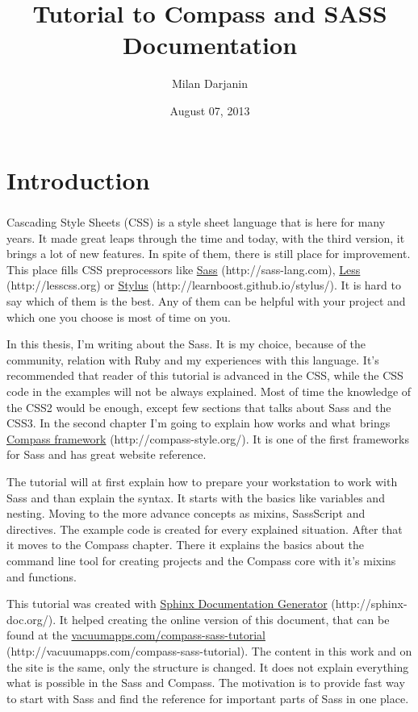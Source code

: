 \documentclass[a4paper,12pt,oneside]{sphinxmanual}
\title{Tutorial to Compass and SASS Documentation}
\date{August 07, 2013}
\author{Milan Darjanin}
\begin{document}
\maketitle
\tableofcontents
{}\label{index::doc}

\chapter*{Introduction}

      \paragraph{}
      Cascading Style Sheets (CSS) is a style sheet language that is here for many years. It made great leaps through the time and today, with the third version, it brings a lot of new features. In spite of them, there is still place for improvement. This place fills CSS preprocessors like \href{http://sass-lang.com}{Sass} (http://sass-lang.com), \href{http://lesscss.org}{Less} (http://lesscss.org) or \href{http://learnboost.github.io/stylus/}{Stylus} (http://learnboost.github.io/stylus/). It is hard to say which of them is the best. Any of them can be helpful with your project and which one you choose is most of time on you.

      In this thesis, I'm writing about the Sass. It is my choice, because of the community, relation with Ruby and my experiences with this language. It's recommended that reader of this tutorial is advanced in the CSS, while the CSS code in the examples will not be always explained. Most of time the knowledge of the CSS2 would be enough, except few sections that talks about Sass and the CSS3. In the second chapter I'm going to explain how works and what brings \href{http://compass-style.org/}{Compass framework} (http://compass-style.org/). It is one of the first frameworks for Sass and has great website reference.

      The tutorial will at first explain how to prepare your workstation to work with Sass and than explain the syntax. It starts with the basics like variables and nesting. Moving to the more advance concepts as mixins, SassScript and directives. The example code is created for every explained situation. After that it moves to the Compass chapter. There it explains the basics about the command line tool for creating projects and the Compass core with it's mixins and functions.

      This tutorial was created with \href{http://sphinx-doc.org/}{Sphinx Documentation Generator} (http://sphinx-doc.org/). It helped creating the online version of this document, that can be found at the \href{http://vacuumapps.com/compass-sass-tutorial}{vacuumapps.com/compass-sass-tutorial} (http://vacuumapps.com/compass-sass-tutorial). The content in this work and on the site is the same, only the structure is changed. It does not explain everything what is possible in the Sass and Compass. The motivation is to provide fast way to start with Sass and find the reference for important parts of Sass in one place.
\end{document}

